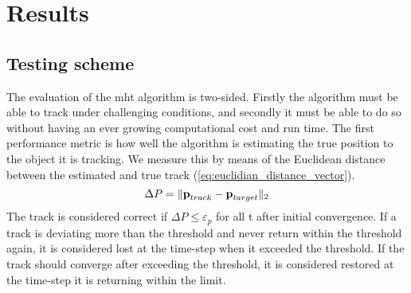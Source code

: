 \section{Results}
\label{sec:results}

\subsection{Testing scheme}
The evaluation of the \gls{mht} algorithm is two-sided. Firstly the algorithm must be able to track under challenging conditions, and secondly it must be able to do so without having an ever growing computational cost and run time. The first performance metric is how well the algorithm is estimating the true position to the object it is tracking. We measure this by means of the Euclidean distance between the estimated and true track (\ref{eq:euclidian_distance_vector}).
\begin{equation}
	\Delta P = \| \boldsymbol{\mathbf{p}}_{track}-\boldsymbol{\mathbf{p}}_{target} \|_2
\label{eq:euclidian_distance_vector}
\end{equation}
The track is considered correct if $\Delta P \leq \varepsilon_p$ for all t after initial convergence. If a track is deviating more than the threshold and never return within the threshold again, it is considered lost at the time-step when it exceeded the threshold. If the track should converge after exceeding the threshold, it is considered restored at the time-step it is returning within the limit. 

